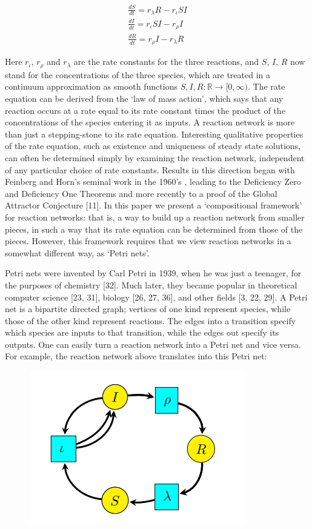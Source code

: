 \documentclass[]{compositionalityarticle}
\begin{document}
\begin{multline}
  \frac{dS}{dt} = r_{\lambda} R - r_{\iota} SI \\
  \frac{dI}{dt} = r_{\iota} SI - r_{\rho} I \\
  \frac{dR}{dt} = r_{\rho} I - r_{\lambda} R
\end{multline}

Here $r_{\iota}$, $r_{\rho}$ and $r_{\lambda}$ are the rate constants for the three reactions, and $S$, $I$, $R$
now stand for the concentrations of the three species, which are treated in a
continuum approximation as smooth functions $S, I, R: \mathbb{R} \rightarrow [0, \infty)$. The rate
equation can be derived from the ‘law of mass action’, which says that any
reaction occurs at a rate equal to its rate constant times the product of the
concentrations of the species entering it as inputs.
A reaction network is more than just a stepping-stone to its rate equation.
Interesting qualitative properties of the rate equation, such as existence and
uniqueness of steady state solutions, can often be determined simply by examining
the reaction network, independent of any particular choice of rate constants.
Results in this direction began with Feinberg and Horn’s seminal work in the
1960’s \cite{2015arXiv150405625B, 2015arXiv151200802S}, leading to the Deficiency Zero and Deficiency One Theorems
\cite{2016arXiv160508100C, 2016arXiv160905382F}  and more recently to a proof of the Global Attractor Conjecture [11].
In this paper we present a ‘compositional framework’ for reaction networks:
that is, a way to build up a reaction network from smaller pieces, in such a way
that its rate equation can be determined from those of the pieces. However,
this framework requires that we view reaction networks in a somewhat different
way, as ‘Petri nets’.

Petri nets were invented by Carl Petri in 1939, when he was just a teenager,
for the purposes of chemistry [32]. Much later, they became popular in theoretical
computer science [23, 31], biology [26, 27, 36], and other fields [3, 22, 29].
A Petri net is a bipartite directed graph; vertices of one kind represent species,
while those of the other kind represent reactions. The edges into a transition
specify which species are inputs to that transition, while the edges out specify
its outputs. One can easily turn a reaction network into a Petri net and vice
versa. For example, the reaction network above translates into this Petri net:

\begin{figure}
  \includegraphics[width=0.5 \textwidth]{fig1.png}
\end{figure}
\end{document}
